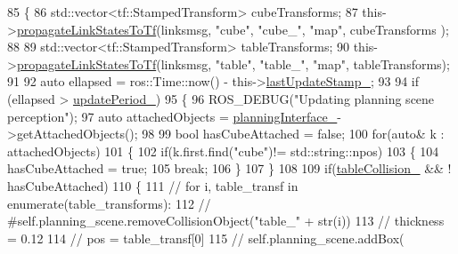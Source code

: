\begin{DoxyCode}
85   \{
86       std::vector<tf::StampedTransform> cubeTransforms;
87       this->\hyperlink{classsm__moveit__3_1_1cl__perception__system_1_1ClPerceptionSystem_a1084d40600fb5764c48447877a3683ef}{propagateLinkStatesToTf}(linksmsg, \textcolor{stringliteral}{"cube"}, \textcolor{stringliteral}{"cube\_"}, \textcolor{stringliteral}{"map"}, cubeTransforms
      );
88 
89       std::vector<tf::StampedTransform> tableTransforms;
90       this->\hyperlink{classsm__moveit__3_1_1cl__perception__system_1_1ClPerceptionSystem_a1084d40600fb5764c48447877a3683ef}{propagateLinkStatesToTf}(linksmsg, \textcolor{stringliteral}{"table"}, \textcolor{stringliteral}{"table\_"}, \textcolor{stringliteral}{"map"}, 
      tableTransforms);
91 
92       \textcolor{keyword}{auto} ellapsed = ros::Time::now() - this->\hyperlink{classsm__moveit__3_1_1cl__perception__system_1_1ClPerceptionSystem_a6f6130fd8e122238855516f6e74eb4e7}{lastUpdateStamp\_};
93 
94       \textcolor{keywordflow}{if} (ellapsed > \hyperlink{classsm__moveit__3_1_1cl__perception__system_1_1ClPerceptionSystem_afc43ae86f2e0074f1ef1650284f54deb}{updatePeriod\_})
95       \{
96           ROS\_DEBUG(\textcolor{stringliteral}{"Updating planning scene perception"});
97           \textcolor{keyword}{auto} attachedObjects = \hyperlink{classsm__moveit__3_1_1cl__perception__system_1_1ClPerceptionSystem_aa59191e3993ffbfc8e8332f76d727259}{planningInterface\_}->getAttachedObjects();
98 
99           \textcolor{keywordtype}{bool} hasCubeAttached = \textcolor{keyword}{false};
100           \textcolor{keywordflow}{for}(\textcolor{keyword}{auto}& k : attachedObjects)
101           \{
102               \textcolor{keywordflow}{if}(k.first.find(\textcolor{stringliteral}{"cube"})!= std::string::npos)
103               \{
104                  hasCubeAttached = \textcolor{keyword}{true};
105                  \textcolor{keywordflow}{break}; 
106               \}
107           \}
108 
109         \textcolor{keywordflow}{if}(\hyperlink{classsm__moveit__3_1_1cl__perception__system_1_1ClPerceptionSystem_a5f5208264dee3b68129e1d9560867f01}{tableCollision\_} && ! hasCubeAttached)
110         \{
111         \textcolor{comment}{//         for i, table\_transf in enumerate(table\_transforms):}
112         \textcolor{comment}{//             #self.planning\_scene.removeCollisionObject("table\_" + str(i))}
113         \textcolor{comment}{//             thickness = 0.12}
114         \textcolor{comment}{//             pos = table\_transf[0]}
115         \textcolor{comment}{//             self.planning\_scene.addBox(}

\end{DoxyCode}
